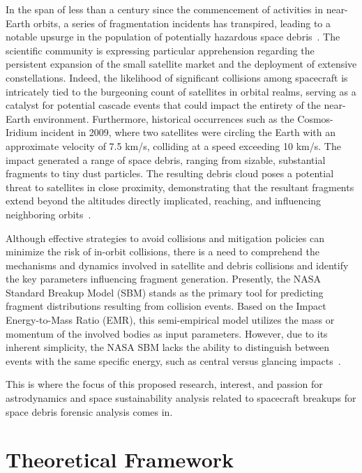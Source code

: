 \documentclass[11pt]{article} %
\begin{document}
In the span of less than a century since the commencement of activities in near-Earth orbits, a series of fragmentation incidents has transpired, leading to a notable upsurge in the population of potentially hazardous space debris~\cite{karacalioglu_impact_2016}. The scientific community is expressing particular apprehension regarding the persistent expansion of the small satellite market and the deployment of extensive constellations. Indeed, the likelihood of significant collisions among spacecraft is intricately tied to the burgeoning count of satellites in orbital realms, serving as a catalyst for potential cascade events that could impact the entirety of the near-Earth environment. Furthermore, historical occurrences such as the Cosmos-Iridium incident in 2009, 
where two satellites were circling the Earth with an approximate velocity of 7.5 km/s, colliding at a speed exceeding 10 km/s. The impact generated a range of space debris, ranging from sizable, substantial fragments to tiny dust particles. The resulting debris cloud poses a potential threat to satellites in close proximity, demonstrating that the resultant fragments extend beyond the altitudes directly implicated, reaching, and influencing neighboring orbits~\cite{wang_analysis_2010}.

Although effective strategies to avoid collisions and mitigation policies can minimize the risk of in-orbit collisions, there is a need to comprehend the mechanisms and dynamics involved in satellite and debris collisions and identify the key parameters influencing fragment generation. Presently, the NASA Standard Breakup Model (SBM) stands as the primary tool for predicting fragment distributions resulting from collision events. Based on the Impact Energy-to-Mass Ratio (EMR), this semi-empirical model utilizes the mass or momentum of the involved bodies as input parameters. However, due to its inherent simplicity, the NASA SBM lacks the ability to distinguish between events with the same specific energy, such as central versus glancing impacts~\cite{johnson_nasas_2001}.

This is where the focus of this proposed research, interest, and passion for astrodynamics and space sustainability analysis related to spacecraft breakups for space debris forensic analysis comes in.

\section{Theoretical Framework}
\end{document}

